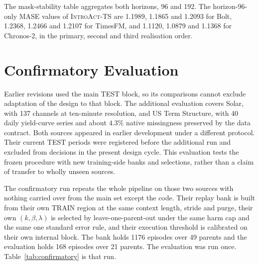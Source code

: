 \documentclass{article}
\newcommand{\introact}{\textsc{IntroAct-TS}}
\begin{document}
The mask-stability table aggregates both horizons, 96 and 192.
The horizon-96-only MASE values of \introact{} are 1.1989, 1.1865 and 1.2093 for Bolt,
1.2368, 1.2466 and 1.2107 for TimesFM, and 1.1120, 1.0879 and 1.1368 for Chronos-2, in the
primary, second and third realisation order.

\section{Confirmatory Evaluation}
\label{app:confirmatory}

Earlier revisions used the main TEST block, so its comparisons cannot exclude adaptation
of the design to that block. The additional evaluation covers Solar, with 137 channels at
ten-minute resolution, and US Term Structure, with 40 daily yield-curve series and about
$4.3\%$ native missingness preserved by the data contract. Both sources appeared in earlier
development under a different protocol. Their current TEST periods were registered before
the additional run and excluded from decisions in the present design cycle. This evaluation
tests the frozen procedure with new training-side banks and selections, rather than a claim
of transfer to wholly unseen sources.

The confirmatory run repeats the whole pipeline on those two sources with nothing carried over
from the main set except the code. Their replay bank is built from their own TRAIN region at
the same context length, stride and purge, their own $(k,\beta,\lambda)$ is selected by
leave-one-parent-out under the same harm cap and the same one standard error rule, and their
execution threshold is calibrated on their own internal block. The bank holds 1176 episodes
over 49 parents and the evaluation holds 168 episodes over 21 parents. The evaluation was run
once. Table~\ref{tab:confirmatory} is that run.
\end{document}
